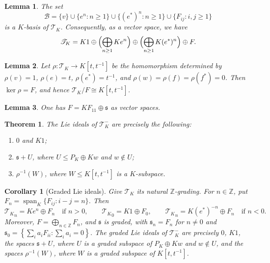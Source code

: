\documentclass[10pt,a4paper]{amsart}
\newtheorem{lemma}{Lemma}
\newtheorem{theorem}{Theorem}
\newtheorem{corollary}{Corollary}
\newcommand{\Span}{\operatorname{span}_K}
\newcommand{\T}{\mathscr T_K}
\begin{document}
\begin{lemma}\label{lem:path-basis}
The set
$$
        \mathcal B=\{v\}\cup\{e^n:n\geq1\}\cup\{(e^*)^n:n\geq1\}\cup\{F_{ij}:i,j\geq1\}
$$
is a $K$-basis of $\T$. Consequently, as a vector space, we have
$$
        \T=K1\oplus\Bigl(\bigoplus_{n\geq1}Ke^n\Bigr)\oplus\Bigl(\bigoplus_{n\geq1}K(e^*)^n\Bigr)\oplus F.
$$
\end{lemma}

\begin{lemma}\label{lem:quotient}
Let $\rho:\T\to K[t,t^{-1}]$ be the homomorphism determined by $\rho(v)=1$, $\rho(e)=t$, $\rho(e^*)=t^{-1}$, and $\rho(w)=\rho(f)=\rho(f^*)=0$. Then $\ker\rho=F$, and hence $\T/F\cong K[t,t^{-1}]$.
\end{lemma}

\begin{lemma}\label{lem:s-trace-zero}
One has $F=KF_{11}\oplus\mathfrak s$ as vector spaces.
\end{lemma}

\begin{theorem}\label{thm:classification}
The Lie ideals of $\T^-$ are precisely the following:
\begin{enumerate}[label=\rm(\roman*)]
\item $0$ and $K1$;
\item $\mathfrak s+U$, where $U\leq P_K\oplus Kw$ and $w\notin U$;
\item $\rho^{-1}(W)$, where $W\leq K[t,t^{-1}]$ is a $K$-subspace.
\end{enumerate}
\end{theorem}

\begin{corollary}[Graded Lie ideals]\label{cor:graded-lie-ideals}
Give $\T$ its natural $\mathbb Z$-grading. For $n\in\mathbb Z$, put $F_n=\Span\{F_{ij}:i-j=n\}$. Then
$$
{\T}_n=K e^n\oplus F_n\quad\text{if }n>0,\qquad
{\T}_0=K1\oplus F_0,\qquad
{\T}_n=K(e^*)^{-n}\oplus F_n\quad\text{if }n<0.
$$
Moreover, $F=\bigoplus_{n\in\mathbb Z}F_n$, and $\mathfrak s$ is graded, with $\mathfrak s_n=F_n$ for $n\neq0$ and $\mathfrak s_0=\left\{\sum_i a_iF_{ii}:\sum_i a_i=0\right\}$. The graded Lie ideals of $\T^-$ are precisely $0$, $K1$, the spaces $\mathfrak s+U$, where $U$ is a graded subspace of $P_K\oplus Kw$ and $w\notin U$, and the spaces $\rho^{-1}(W)$, where $W$ is a graded subspace of $K[t,t^{-1}]$.
\end{corollary}
\end{document}
